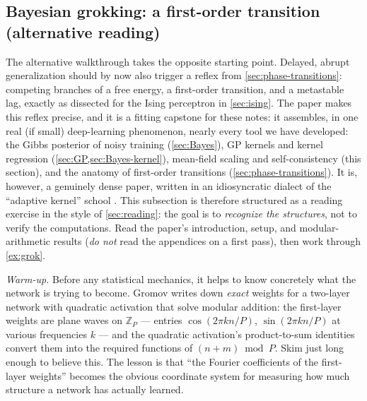 \documentclass[11pt]{article}
\begin{document}
\subsection{Bayesian grokking: a first-order transition (alternative reading)}
\label{sec:grok}

The alternative walkthrough takes the opposite starting point. Delayed, abrupt generalization should by now also trigger a reflex from \cref{sec:phase-transitions}: competing branches of a free energy, a first-order transition, and a metastable lag, exactly as dissected for the Ising perceptron in \cref{sec:ising}. The paper \cite{rubin2024grokking} makes this reflex precise, and it is a fitting capstone for these notes: it assembles, in one real (if small) deep-learning phenomenon, nearly every tool we have developed: the Gibbs posterior of noisy training (\cref{sec:Bayes}), GP kernels and kernel regression (\cref{sec:GP,sec:Bayes-kernel}), mean-field scaling and self-consistency (this section), and the anatomy of first-order transitions (\cref{sec:phase-transitions}). It is, however, a genuinely dense paper, written in an idiosyncratic dialect of the ``adaptive kernel'' school \cite{seroussi2023separation}. This subsection is therefore structured as a reading exercise in the style of \cref{sec:reading}: the goal is to \emph{recognize the structures}, not to verify the computations. Read the paper's introduction, setup, and modular-arithmetic results (\emph{do not} read the appendices on a first pass), then work through \cref{ex:grok}.

\emph{Warm-up.} Before any statistical mechanics, it helps to know concretely what the network is trying to become. Gromov \cite{gromov2023grokking} writes down \emph{exact} weights for a two-layer network with quadratic activation that solve modular addition: the first-layer weights are plane waves on $\mathbb{Z}_P$ --- entries $\cos(2\pi k n/P)$, $\sin(2\pi k n/P)$ at various frequencies $k$ --- and the quadratic activation's product-to-sum identities convert them into the required functions of $(n+m) \bmod P$. Skim \cite{gromov2023grokking} just long enough to believe this. The lesson is that ``the Fourier coefficients of the first-layer weights'' becomes the obvious coordinate system for measuring how much structure a network has actually learned.
\end{document}
